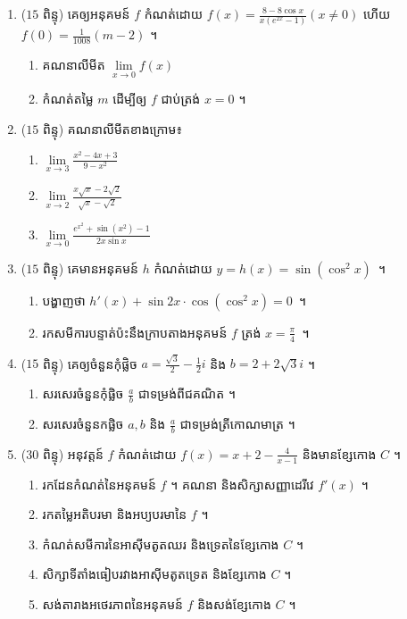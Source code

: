 \documentclass[a4paper, 12pt]{exam}
\def\hard{\leavevmode\makebox[0pt][r]{\large\ensuremath{\star}\hspace{2em}}}
\begin{document}
\begin{enumerate}[I]
	\item ($ 15 $ ពិន្ទុ) គេឲ្យអនុគមន៍ $f$ កំណត់ដោយ $f(x)=\frac{8-8\cos x}{x(e^{2x}-1)} (x\neq0)$ ហើយ $f(0)=\frac{1}{1008}(m-2)$ ។
	\begin{enumerate}[1]
		\item គណនាលីមីត $\lim\limits_{x\to0}f(x)$
		\item កំណត់តម្លៃ $m$ ដើម្បីឲ្យ $f$ ជាប់ត្រង់ $x=0$ ។
	\end{enumerate}
	\item ($ 15 $ ពិន្ទុ) គណនាលីមីតខាងក្រោម៖
	\begin{multicols}{3}
		\begin{enumerate}[a]
			\item $ \lim\limits_{x\to 3}\frac{x^2-4x+3}{9-x^2} $
			\item $ \lim\limits_{x\to 2}\frac{x\sqrt{x}-2\sqrt{2}}{\sqrt{x}-\sqrt{2}} $
			\item $ \lim\limits_{x\to 0}\frac{e^{x^2}+\sin (x^2)-1}{2x\sin x} $
		\end{enumerate}
	\end{multicols}
	\item ($ 15 $ ពិន្ទុ) គេមានអនុគមន៍ $h$ កំណត់ដោយ $ y=h(x)=\sin(\cos^2x)$~។
	\begin{enumerate}[1]
		\item បង្ហាញថា $h'(x)+\sin2x\cdot\cos(\cos^2x)=0$~។
		\item រកសមីការបន្ទាត់ប៉ះនឹងក្រាបតាងអនុគមន៍ $f$ ត្រង់ $x=\frac{\pi}{4}$~។
	\end{enumerate}
	\item ($ 15 $ ពិន្ទុ) គេឲ្យចំនួនកុំផ្លិច $a=\frac{\sqrt{3}}{2}-\frac{1}{2}i$
	និង $b=2+2\sqrt{3}i$ ។
	\begin{enumerate}[1]
		\item សរសេរចំនួនកុំផ្លិច $\frac{a}{b}$ ជាទម្រង់ពីជគណិត ។
		\item សរសេរចំនួនកផ្លិច $a, b$ និង $\frac{a}{b}$ ជាទម្រង់ត្រីកោណមាត្រ ។
	\end{enumerate}
	\item\hard ($ 30 $ ពិន្ទុ) អនុវត្តន៍ $ f $ កំណត់ដោយ $f(x)=x+2-\frac{4}{x-1}$ និងមានខ្សែកោង $C$ ។
	\begin{enumerate}[a]
		\item រកដែនកំណត់នៃអនុគមន៍ $f$ ។ គណនា និងសិក្សាសញ្ញាដេរីវេ $f'(x)$ ។
		\item រកតម្លៃអតិបរមា និងអប្យបរមានៃ $f$ ។
		\item កំណត់សមីការនៃអាស៊ីមតូតឈរ និងទ្រេតនៃខ្សែកោង $C$ ។
		\item សិក្សាទីតាំងធៀបរវាងអាស៊ីមតូតទ្រេត និងខ្សែកោង $C$ ។
		\item សង់តារាងអថេរភាពនៃអនុគមន៍ $f$ និងសង់ខ្សែកោង $C$ ។
	\end{enumerate}
	

\end{enumerate}
\end{document}
